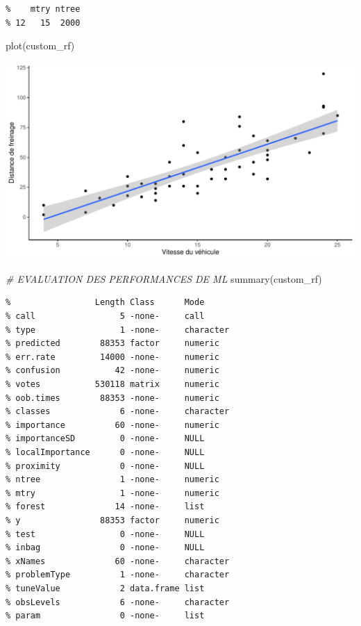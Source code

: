 \documentclass[
]{article}
\newenvironment{Shaded}{\begin{snugshade}}{\end{snugshade}}
\newcommand{\CommentTok}[1]{\textcolor[rgb]{0.56,0.35,0.01}{\textit{#1}}}
\newcommand{\FunctionTok}[1]{\textcolor[rgb]{0.00,0.00,0.00}{#1}}
\newcommand{\NormalTok}[1]{#1}
\begin{document}
\begin{verbatim}
%    mtry ntree
% 12   15  2000
\end{verbatim}

\begin{Shaded}
\begin{Highlighting}[]
\FunctionTok{plot}\NormalTok{(custom\_rf)}
\end{Highlighting}
\end{Shaded}

\includegraphics{Learning_R_files/figure-latex/unnamed-chunk-8-1.pdf}

\begin{Shaded}
\begin{Highlighting}[]
\CommentTok{\# EVALUATION DES PERFORMANCES DE ML}
\FunctionTok{summary}\NormalTok{(custom\_rf)}
\end{Highlighting}
\end{Shaded}

\begin{verbatim}
%                 Length Class      Mode     
% call                 5 -none-     call     
% type                 1 -none-     character
% predicted        88353 factor     numeric  
% err.rate         14000 -none-     numeric  
% confusion           42 -none-     numeric  
% votes           530118 matrix     numeric  
% oob.times        88353 -none-     numeric  
% classes              6 -none-     character
% importance          60 -none-     numeric  
% importanceSD         0 -none-     NULL     
% localImportance      0 -none-     NULL     
% proximity            0 -none-     NULL     
% ntree                1 -none-     numeric  
% mtry                 1 -none-     numeric  
% forest              14 -none-     list     
% y                88353 factor     numeric  
% test                 0 -none-     NULL     
% inbag                0 -none-     NULL     
% xNames              60 -none-     character
% problemType          1 -none-     character
% tuneValue            2 data.frame list     
% obsLevels            6 -none-     character
% param                0 -none-     list
\end{verbatim}
\end{document}
